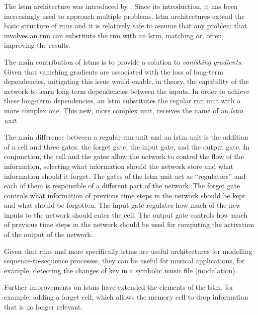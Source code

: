 

The \gls{lstm} architecture was introduced by
\textcite{hochreiter1997long}. Since its introduction, it
has been increasingly used to approach multiple problems.
\gls{lstm} architectures extend the basic structure of
\glspl{rnn} and it is relatively safe to assume that any
problem that involves an \gls{rnn} can substitute the
\gls{rnn} with an \gls{lstm}, matching or, often, improving
the results.

The main contribution of \glspl{lstm} is to provide a
solution to \emph{vanishing gradients}. Given that vanishing
gradients are associated with the loss of long-term
dependencies, mitigating this issue would enable, in theory,
the capability of the network to learn long-term
dependencies between the inputs. In order to achieve these
long-term dependencies, an \gls{lstm} substitutes the
regular \gls{rnn} unit with a more complex one. This new,
more complex unit, receives the name of an \emph{\gls{lstm}
unit}.

The main difference between a regular \gls{rnn} unit and an
\gls{lstm} unit is the addition of a cell and three gates:
the forget gate, the input gate, and the output gate. In
conjunction, the cell and the gates allow the network to
control the flow of the information, selecting what
information should the network store and what information
should it forget. The gates of the \gls{lstm} unit act as
``regulators'' and each of them is responsible of a
different part of the network. The forget gate controls what
information of previous time steps in the network should be
kept and what should be forgotten. The input gate regulates
how much of the new inputs to the network should enter the
cell. The output gate controls how much of previous time
steps in the network should be used for computing the
activation of the output of the network.

Given that \glspl{rnn} and more specifically \glspl{lstm}
are useful architectures for modelling sequence-to-sequence
processes, they can be useful for musical applications, for
example, detecting the changes of key in a symbolic music
file (modulation).


Further improvements on \glspl{lstm} have extended the
elements of the \gls{lstm}, for example, adding a forget
cell, which allows the memory cell to drop information that
is no longer relevant.

